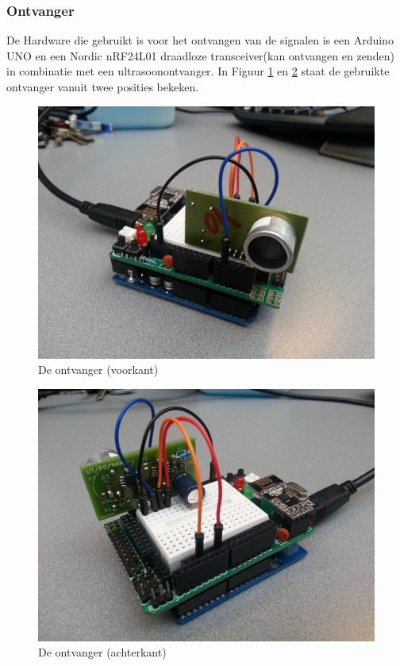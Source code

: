 \documentclass{article}
\begin{document}
\subsubsection{Ontvanger}
De Hardware die gebruikt is voor het ontvangen van de signalen is een Arduino UNO en een Nordic nRF24L01 draadloze transceiver(kan ontvangen en zenden) in combinatie met een ultrasoonontvanger. In Figuur \ref{voorkant} en \ref{achterkant} staat de gebruikte ontvanger vanuit twee posities bekeken.
\begin{figure}[h]
\centering\includegraphics[scale=0.06]{voorkant.jpg}
\caption{De ontvanger (voorkant)}
\label{voorkant}
\end{figure}
\begin{figure}[h]
\centering\includegraphics[scale=0.06]{achterkant.jpg}
\caption{De ontvanger (achterkant)}
\label{achterkant}
\end{figure}
\end{document}
